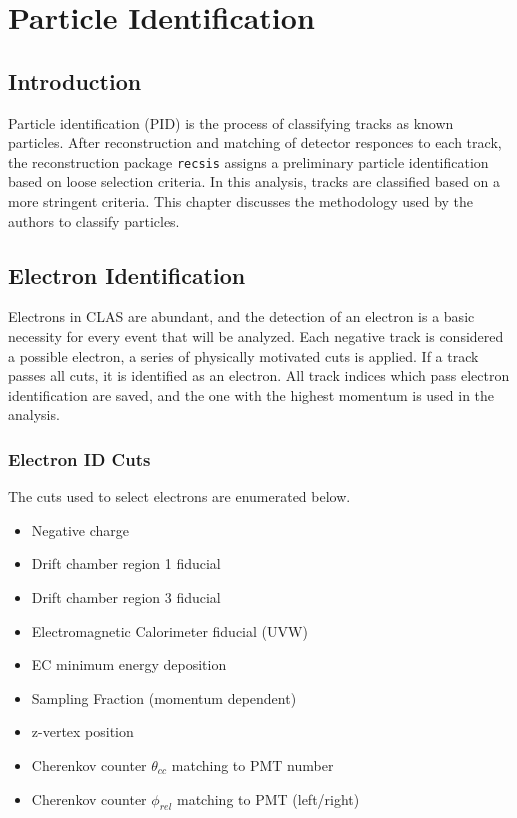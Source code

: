 \chapter{Particle Identification}


\section{Introduction}
Particle identification (PID) is the process of classifying tracks as known particles.  After reconstruction and matching of detector responces to each track, the reconstruction package \texttt{recsis} assigns a preliminary particle identification based on loose selection criteria.  In this analysis, tracks are classified based on a more stringent criteria.  This chapter discusses the methodology used by the authors to classify particles.

\section{Electron Identification}
Electrons in CLAS are abundant, and the detection of an electron is a basic necessity for every event that will be analyzed.  Each negative track is considered a possible electron, a series of physically motivated cuts is applied.  If a track passes all cuts, it is identified as an electron.  All track indices which pass electron identification are saved, and the one with the highest momentum is used in the analysis.  
\\


\subsection{Electron ID Cuts}

The cuts used to select electrons are enumerated below.

\begin{itemize}
  \item{Negative charge}
  \item{Drift chamber region 1 fiducial}
  \item{Drift chamber region 3 fiducial}
  \item{Electromagnetic Calorimeter fiducial (UVW)}
  \item{EC minimum energy deposition}
  \item{Sampling Fraction (momentum dependent)}
  \item{z-vertex position}
  \item{Cherenkov counter $\theta_{cc}$ matching to PMT number}
  \item{Cherenkov counter $\phi_{rel}$ matching to PMT (left/right)}
\end{itemize}

